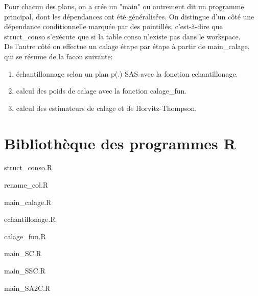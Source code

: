 \documentclass[11pt,fleqn]{book} %
\begin{document}
\vspace{1em}

Pour chacun des plans, on a crée un  "main" ou autrement dit un programme principal, dont les dépendances ont été généralisées. On distingue d'un côté une dépendance conditionnelle marquée par des pointillés, c'est-à-dire que struct\_conso s'exécute que si la table conso n'existe pas dans le workspace.\\ 
De l'autre côté on effectue un calage étape par étape à partir de main\_calage, qui se résume de la facon suivante:\\ 
\begin{enumerate}
\item échantillonnage selon un plan p(.) SAS avec la fonction echantillonage.
\item calcul des poids de calage avec la fonction calage\_fun. 
\item calcul des estimateurs de calage et de Horvitz-Thompson.
\end{enumerate}


\vspace{4em}

\section{Bibliothèque des programmes R}

\vspace{2em}

 {struct_conso.R}

\newpage

\vspace{2em}

 {rename_col.R}


\newpage

 {main_calage.R}

\newpage

 {echantillonage.R}

 {calage_fun.R}


\newpage

 {main_SC.R}

 {main_SSC.R}


 {main_SA2C.R}

\newpage
\end{document}

